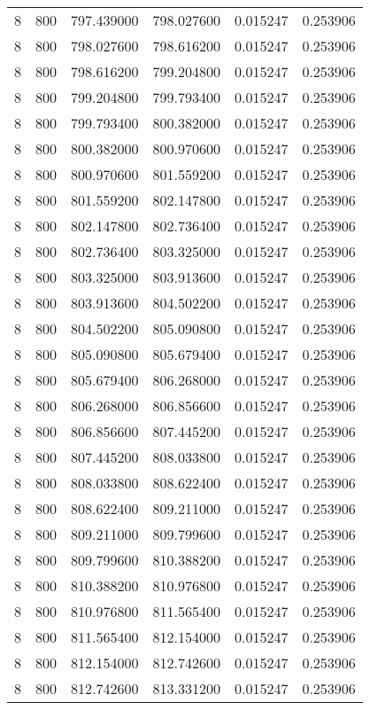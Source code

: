 \begin{longtable}{rrrrrr}
8 & 800 & 797.439000 & 798.027600 & 0.015247 & 0.253906 \\
8 & 800 & 798.027600 & 798.616200 & 0.015247 & 0.253906 \\
8 & 800 & 798.616200 & 799.204800 & 0.015247 & 0.253906 \\
8 & 800 & 799.204800 & 799.793400 & 0.015247 & 0.253906 \\
8 & 800 & 799.793400 & 800.382000 & 0.015247 & 0.253906 \\
8 & 800 & 800.382000 & 800.970600 & 0.015247 & 0.253906 \\
8 & 800 & 800.970600 & 801.559200 & 0.015247 & 0.253906 \\
8 & 800 & 801.559200 & 802.147800 & 0.015247 & 0.253906 \\
8 & 800 & 802.147800 & 802.736400 & 0.015247 & 0.253906 \\
8 & 800 & 802.736400 & 803.325000 & 0.015247 & 0.253906 \\
8 & 800 & 803.325000 & 803.913600 & 0.015247 & 0.253906 \\
8 & 800 & 803.913600 & 804.502200 & 0.015247 & 0.253906 \\
8 & 800 & 804.502200 & 805.090800 & 0.015247 & 0.253906 \\
8 & 800 & 805.090800 & 805.679400 & 0.015247 & 0.253906 \\
8 & 800 & 805.679400 & 806.268000 & 0.015247 & 0.253906 \\
8 & 800 & 806.268000 & 806.856600 & 0.015247 & 0.253906 \\
8 & 800 & 806.856600 & 807.445200 & 0.015247 & 0.253906 \\
8 & 800 & 807.445200 & 808.033800 & 0.015247 & 0.253906 \\
8 & 800 & 808.033800 & 808.622400 & 0.015247 & 0.253906 \\
8 & 800 & 808.622400 & 809.211000 & 0.015247 & 0.253906 \\
8 & 800 & 809.211000 & 809.799600 & 0.015247 & 0.253906 \\
8 & 800 & 809.799600 & 810.388200 & 0.015247 & 0.253906 \\
8 & 800 & 810.388200 & 810.976800 & 0.015247 & 0.253906 \\
8 & 800 & 810.976800 & 811.565400 & 0.015247 & 0.253906 \\
8 & 800 & 811.565400 & 812.154000 & 0.015247 & 0.253906 \\
8 & 800 & 812.154000 & 812.742600 & 0.015247 & 0.253906 \\
8 & 800 & 812.742600 & 813.331200 & 0.015247 & 0.253906 \\

\end{longtable}

